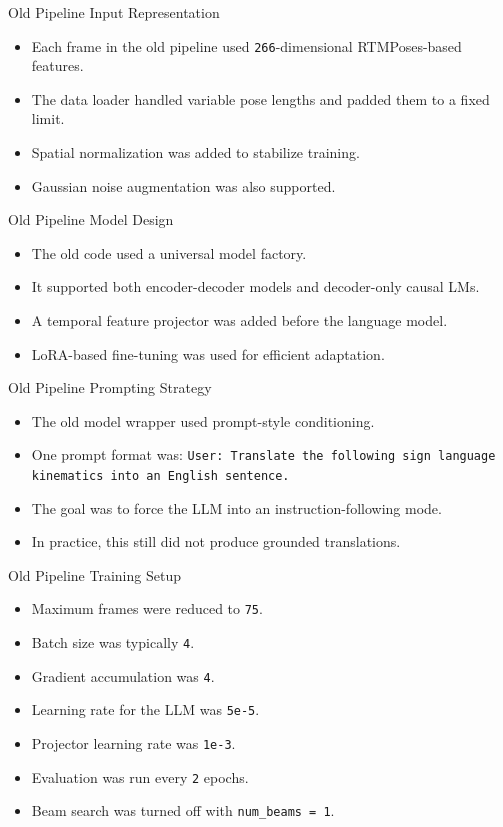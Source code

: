\documentclass[aspectratio=169]{beamer}
\begin{document}
\begin{frame}{Old Pipeline Input Representation}
\begin{itemize}
  \item Each frame in the old pipeline used \texttt{266}-dimensional RTMPoses-based features.
  \item The data loader handled variable pose lengths and padded them to a fixed limit.
  \item Spatial normalization was added to stabilize training.
  \item Gaussian noise augmentation was also supported.
\end{itemize}
\end{frame}

\begin{frame}{Old Pipeline Model Design}
\begin{itemize}
  \item The old code used a universal model factory.
  \item It supported both encoder-decoder models and decoder-only causal LMs.
  \item A temporal feature projector was added before the language model.
  \item LoRA-based fine-tuning was used for efficient adaptation.
\end{itemize}
\end{frame}

\begin{frame}{Old Pipeline Prompting Strategy}
\begin{itemize}
  \item The old model wrapper used prompt-style conditioning.
  \item One prompt format was: \texttt{User: Translate the following sign language kinematics into an English sentence.}
  \item The goal was to force the LLM into an instruction-following mode.
  \item In practice, this still did not produce grounded translations.
\end{itemize}
\end{frame}

\begin{frame}{Old Pipeline Training Setup}
\begin{itemize}
  \item Maximum frames were reduced to \texttt{75}.
  \item Batch size was typically \texttt{4}.
  \item Gradient accumulation was \texttt{4}.
  \item Learning rate for the LLM was \texttt{5e-5}.
  \item Projector learning rate was \texttt{1e-3}.
  \item Evaluation was run every \texttt{2} epochs.
  \item Beam search was turned off with \texttt{num\_beams = 1}.
\end{itemize}
\end{frame}
\end{document}
